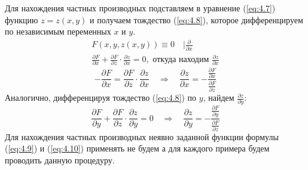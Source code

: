 Для нахождения частных производных подставляем в уравнение (\ref{eq:4.7}) функцию $z = z(x,y)$ и получаем тождество (\ref{eq:4.8}), которое дифференцируем по независимым переменных $x$ и $y$.
\begin{gather*}
	F(x,y,z(x,y)) \equiv 0 \quad | \frac{\partial }{\partial x}\\
	\frac{\partial F}{\partial x} + \frac{\partial F}{\partial z} \cdot \frac{\partial z}{\partial x} = 0, \text{ откуда находим $\frac{\partial z}{\partial x}$}
\end{gather*}
\begin{equation} \label{eq:4.9}
	-\frac{\partial F}{\partial x} = \frac{\partial F}{\partial z} \cdot \frac{\partial z}{\partial x} \quad \Rightarrow \quad \boxed{\frac{\partial z}{\partial x} = -\frac{\frac{\partial F}{\partial x}}{\frac{\partial F}{\partial z}}}
\end{equation}
Аналогично, дифференцируя тождество (\ref{eq:4.8}) по $y$, найдем $\frac{\partial z}{\partial y}$:
\begin{equation} \label{eq:4.10}
	\frac{\partial F}{\partial y} + \frac{\partial F}{\partial z} \cdot \frac{\partial z}{\partial y} = 0 \quad \Rightarrow \quad \boxed{\frac{\partial z}{\partial y} = - \frac{\frac{\partial F}{\partial y}}{\frac{\partial F}{\partial z}}}
\end{equation}
Для нахождения частных производных неявно заданной функции формулы (\ref{eq:4.9}) и (\ref{eq:4.10}) применять не будем а для каждого примера будем проводить данную процедуру.

